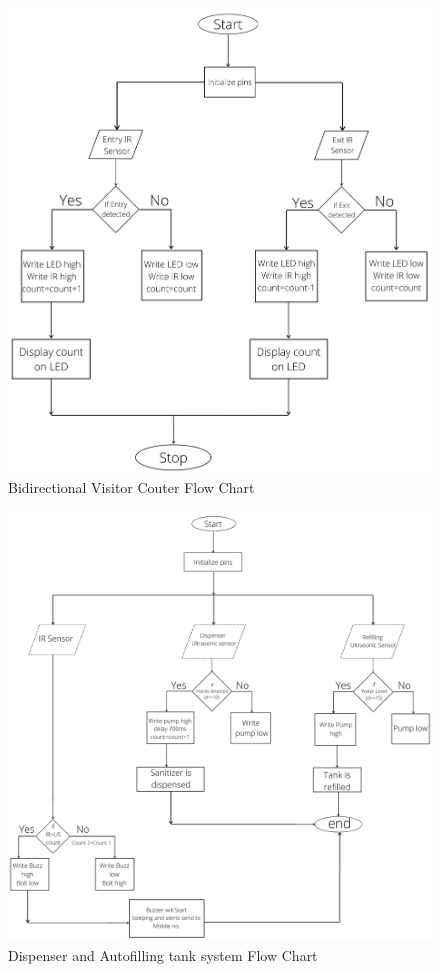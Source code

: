 \begin{figure}[h]
		\centering
	\includegraphics[width=135mm,scale=1]{flowchart1}
	\caption{Bidirectional Visitor Couter Flow Chart}
	\label{Bidirectional Visitor Couter Flow Chart}
	
\end{figure}

\begin{figure}[h]
		\centering
	\includegraphics[width=150mm,scale=1]{flowchart2}
	\caption{Dispenser and Autofilling tank system Flow Chart}
	\label{Dispenser and Autofilling tank system Flow Chart}
	
\end{figure}







